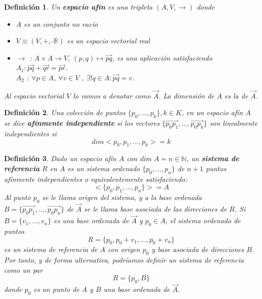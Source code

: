 \documentclass[a4paper,11pt, oneside]{book}
\newtheorem{defi}{Definición}
\begin{document}
\begin{defi}
	Un \textbf{espacio afín} es una tripleta $(A, V, \rightarrow)$ donde
	\begin{itemize}
		\item $A$ es un conjunto no vacío
		\item $V \equiv (V, +, \cdot \mathbb R)$ es un espacio vectorial real
		\item $\rightarrow$ : $A \times A \rightarrow V$, $(p,q) \mapsto \overrightarrow{pq}$, es una aplicación satisfaciendo \\
		$A_1 : \overrightarrow{pq} + \overrightarrow{qr} = \overrightarrow{pr}$.  \\
		$A_2$ : $\forall p \in A$, $\forall v \in V$ , $\exists! q \in A : \overrightarrow{pq} = v$.
	\end{itemize}
	Al espacio vectorial $V$ lo vamos a denotar como $\overrightarrow{A}$. La dimensión de $A$ es la de $\overrightarrow{A}$.
\end{defi}
\begin{defi}
	Una colección de puntos $\{p_0,...,p_k\}, k \in K$, en un espacio afín $A$ se dice \textbf{afínmente independiente} si los vectores $\{\overrightarrow{p_0p_1},...,\overrightarrow{p_0p_k}\}$ son linealmente independientes si
	\begin{equation}
	dim<{p_0,p_1,...,p_k}> = k
	\end{equation}
\end{defi}
\begin{defi}
	Dado un espacio afín $A$ con dim $A = n \in \mathbb N$, un \textbf{sistema de referencia} $R$ en $A$ es un sistema ordenado $\{p_0, ..., p_n\}$ de $n+1$ puntos afínmente independientes o equivalentemente satisfaciendo:
	\begin{equation}
	<\{p_0,p_1,...,p_n\}> = A
	\end{equation}
	Al punto $p_0$ se le llama origen del sistema, y a la base ordenada $B = \{\overrightarrow{p_0p_1}, ..., \overrightarrow{p_0p_n}\}$ de $\overrightarrow{A}$ se le llama base asociada de las direcciones de $R$.
	Si $B = \{v_1,...,v_n\}$ es una base ordenada de $\overrightarrow{A}$ y $p_0 \in A$, el sistema ordenado de puntos
	\begin{equation}
	R = \{p_0, p_0+v_1, ..., p_0+v_n\}
	\end{equation}
	es un sistema de referencia de $A$ con origen $p_0$ y base asociada de direcciones $B$. Por tanto, y de forma alternativa, podríamos definir un sistema de referencia como un par
	\begin{equation}
	R = \{p_0, B\}
	\end{equation}
	donde $p_0$ es un punto de $A$ y $B$ una base ordenada de $\overrightarrow{A}$.
\end{defi}
\end{document}

